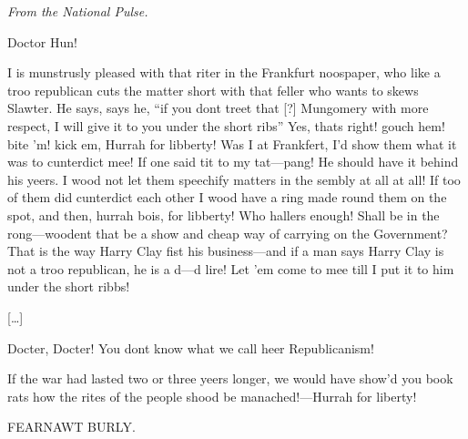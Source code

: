 \begin{ipquote}
\begin{center}
\textit{From the National Pulse.}\\
\end{center}
Doctor Hun!

{I is munstrusly pleased with that riter in the Frankfurt noospaper, who like a troo republican cuts the matter short with that feller who wants to skews Slawter. He says, says he, “if you dont treet that [?] Mungomery with more respect, I will give it to you under the short ribs” Yes, thats right! gouch hem! bite ’m! kick em, Hurrah for libberty! Was I at Frankfert, I’d show them what it was to cunterdict mee! If one said tit to my tat—pang! He should have it behind his yeers. I wood not let them speechify matters in the sembly at all at all! If too of them did cunterdict each other I wood have a ring made round them on the spot, and then, hurrah bois, for libberty! Who hallers enough! Shall be in the rong—woodent that be a show and cheap way of carrying on the Government? That is the way Harry Clay fist his business—and if a man says Harry Clay is not a troo republican, he is a d—d lire! Let ’em come to mee till I put it to him under the short ribbs!

\centering
{[…]}

Docter, Docter! You dont know what we call heer Republicanism!} {If the war had lasted two or three yeers longer, we would have show’d you book rats how the rites of the people shood be manached!—Hurrah for liberty!

\raggedleft
FEARNAWT BURLY.\\}
\end{ipquote}

